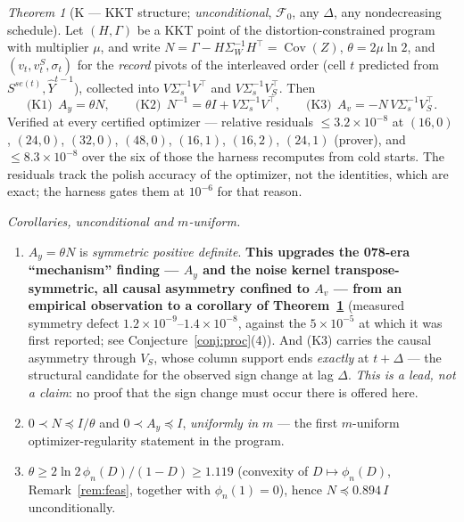 \documentclass[11pt]{article}
\theoremstyle{definition}
\theoremstyle{remark}
\newtheorem{namedthm}{Theorem}
\begin{document}
\begin{namedthm}[K --- KKT structure; \emph{unconditional},
$\mathcal F_0$, any $\Delta$, any nondecreasing schedule]
\label{thm:K}
Let $(H,\Gamma)$ be a KKT point of the distortion-constrained program
with multiplier $\mu$, and write $N=\Gamma-H\Sigma_W^{-1}H^{\!\top}
=\operatorname{Cov}(Z)$, $\theta=2\mu\ln2$, and
$(v_t,v^S_t,\sigma_t)$ for the \emph{record} pivots of the interleaved
order (cell $t$ predicted from $S^{se(t)},\hat Y^{t-1}$), collected
into $V\Sigma_s^{-1}V^{\!\top}$ and $V\Sigma_s^{-1}V_S^{\!\top}$. Then
\[
\text{(K1)}\ \ A_y=\theta N,\qquad
\text{(K2)}\ \ N^{-1}=\theta I+V\Sigma_s^{-1}V^{\!\top},\qquad
\text{(K3)}\ \ A_v=-N\,V\Sigma_s^{-1}V_S^{\!\top}.
\]
Verified at every certified optimizer --- relative residuals
$\le3.2\times10^{-8}$ at $(16,0)$, $(24,0)$, $(32,0)$, $(48,0)$,
$(16,1)$, $(16,2)$, $(24,1)$ (prover), and $\le8.3\times10^{-8}$ over
the six of those the harness recomputes from cold starts. The
residuals track the polish accuracy of the optimizer, not the
identities, which are exact; the harness gates them at $10^{-6}$ for
that reason.
\end{namedthm}

\noindent\emph{Corollaries, unconditional and $m$-uniform.}
\begin{enumerate}
\item[(a)] $A_y=\theta N$ is \emph{symmetric positive definite}.
\textbf{This upgrades the 078-era ``mechanism'' finding --- $A_y$ and
the noise kernel transpose-symmetric, all causal asymmetry confined to
$A_v$ --- from an empirical observation to a corollary of
Theorem~\ref{thm:K}} (measured symmetry defect
$1.2\times10^{-9}$--$1.4\times10^{-8}$, against the
$5\times10^{-5}$ at which it was first reported; see
Conjecture~\ref{conj:proc}(4)). And (K3) carries the causal asymmetry
through $V_S$, whose column support ends \emph{exactly} at $t+\Delta$
--- the structural candidate for the observed sign change at lag
$\Delta$. \emph{This is a lead, not a claim}: no proof that the sign
change must occur there is offered here.
\item[(b)] $0\prec N\preceq I/\theta$ and $0\prec A_y\preceq I$,
\emph{uniformly in $m$} --- the first $m$-uniform optimizer-regularity
statement in the program.
\item[(c)] $\theta\ge2\ln2\,\phi_n(D)/(1-D)\ge1.119$ (convexity of
$D\mapsto\phi_n(D)$, Remark~\ref{rem:feas}, together with
$\phi_n(1)=0$), hence $N\preceq0.894\,I$ unconditionally.
\end{enumerate}
\end{document}
